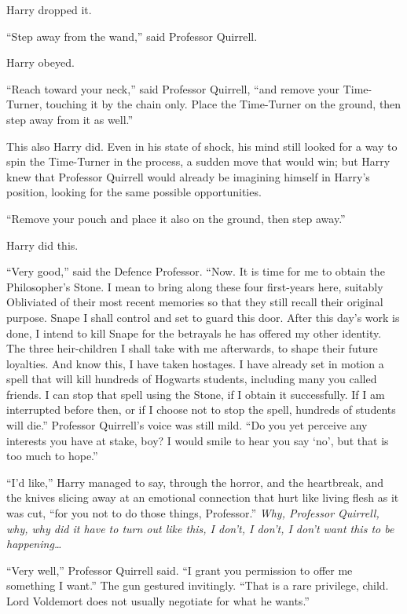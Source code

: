 Harry dropped it.

“Step away from the wand,” said Professor Quirrell.

Harry obeyed.

“Reach toward your neck,” said Professor Quirrell, “and remove your Time-Turner, touching it by the chain only. Place the Time-Turner on the ground, then step away from it as well.”

This also Harry did. Even in his state of shock, his mind still looked for a way to spin the Time-Turner in the process, a sudden move that would win; but Harry knew that Professor Quirrell would already be imagining himself in Harry’s position, looking for the same possible opportunities.

“Remove your pouch and place it also on the ground, then step away.”

Harry did this.

“Very good,” said the Defence Professor. “Now. It is time for me to obtain the Philosopher’s Stone. I mean to bring along these four first-years here, suitably Obliviated of their most recent memories so that they still recall their original purpose. Snape I shall control and set to guard this door. After this day’s work is done, I intend to kill Snape for the betrayals he has offered my other identity. The three heir-children I shall take with me afterwards, to shape their future loyalties. And know this, I have taken hostages. I have already set in motion a spell that will kill hundreds of Hogwarts students, including many you called friends. I can stop that spell using the Stone, if I obtain it successfully. If I am interrupted before then, or if I choose not to stop the spell, hundreds of students will die.” Professor Quirrell’s voice was still mild. “Do you yet perceive any interests you have at stake, boy? I would smile to hear you say ‘no’, but that is too much to hope.”

“I’d like,” Harry managed to say, through the horror, and the heartbreak, and the knives slicing away at an emotional connection that hurt like living flesh as it was cut, “for you not to do those things, Professor.” \emph{Why, Professor Quirrell, why, why did it have to turn out like this, I don’t, I don’t, I don’t want this to be happening…}

“Very well,” Professor Quirrell said. “I grant you permission to offer me something I want.” The gun gestured invitingly. “That is a rare privilege, child. Lord Voldemort does not usually negotiate for what he wants.”

